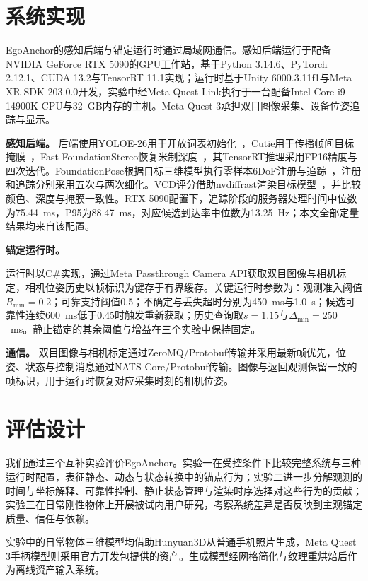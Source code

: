 \documentclass[review]{vgtc}
\begin{document}
\section{系统实现}\label{sec:implementation}

EgoAnchor的感知后端与锚定运行时通过局域网通信。感知后端运行于配备NVIDIA GeForce RTX 5090的GPU工作站，基于Python 3.14.6、PyTorch 2.12.1、CUDA 13.2与TensorRT 11.1实现；运行时基于Unity 6000.3.11f1与Meta XR SDK 203.0.0开发，实验中经Meta Quest Link执行于一台配备Intel Core i9-14900K CPU与32~GB内存的主机。Meta Quest 3承担双目图像采集、设备位姿追踪与显示。

\textbf{感知后端。}
后端使用YOLOE-26用于开放词表初始化~\cite{yoloe2025}，Cutie用于传播帧间目标掩膜~\cite{cutie2024}，Fast-FoundationStereo恢复米制深度~\cite{foundationstereo2025}，其TensorRT推理采用FP16精度与四次迭代。FoundationPose根据目标三维模型执行零样本6DoF注册与追踪~\cite{foundationpose2024}，注册和追踪分别采用五次与两次细化。VCD评分借助nvdiffrast渲染目标模型~\cite{nvdiffrast2020}，并比较颜色、深度与掩膜一致性。RTX 5090配置下，追踪阶段的服务器处理时间中位数为75.44~ms，P95为88.47~ms，对应候选到达率中位数为13.25~Hz；本文全部定量结果均来自该配置。

\textbf{锚定运行时。}

运行时以C\#实现，通过Meta Passthrough Camera API获取双目图像与相机标定，相机位姿历史以帧标识为键存于有界缓存。关键运行时参数为：观测准入阈值$R_{\min}=0.2$；可靠支持阈值0.5；不确定与丢失超时分别为450~ms与1.0~s；候选可靠性连续600~ms低于0.45时触发重新获取；历史查询取$s=1.15$与$\Delta_{\min}=250$~ms。静止锚定的其余阈值与增益在三个实验中保持固定。

\textbf{通信。}
双目图像与相机标定通过ZeroMQ/Protobuf传输并采用最新帧优先，位姿、状态与控制消息通过NATS Core/Protobuf传输。图像与返回观测保留一致的帧标识，用于运行时恢复对应采集时刻的相机位姿。

\section{评估设计}\label{sec:evaluation}
我们通过三个互补实验评价EgoAnchor。实验一在受控条件下比较完整系统与三种运行时配置，表征静态、动态与状态转换中的锚点行为；实验二进一步分解观测的时间与坐标解释、可靠性控制、静止状态管理与渲染时序选择对这些行为的贡献；实验三在日常刚性物体上开展被试内用户研究，考察系统差异是否反映到主观锚定质量、信任与依赖。

实验中的日常物体三维模型均借助Hunyuan3D从普通手机照片生成，Meta Quest 3手柄模型则采用官方开发包提供的资产。生成模型经网格简化与纹理重烘焙后作为离线资产输入系统。
\end{document}
